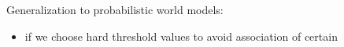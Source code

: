 \documentclass[conference]{IEEEtran}
\begin{document}
Generalization to probabilistic world models: 
\begin{itemize}
\item if we choose hard threshold values to avoid association of certain 
\end{itemize}








%
% 
% 
% 
% 
% 


{\small


}
\end{document}
